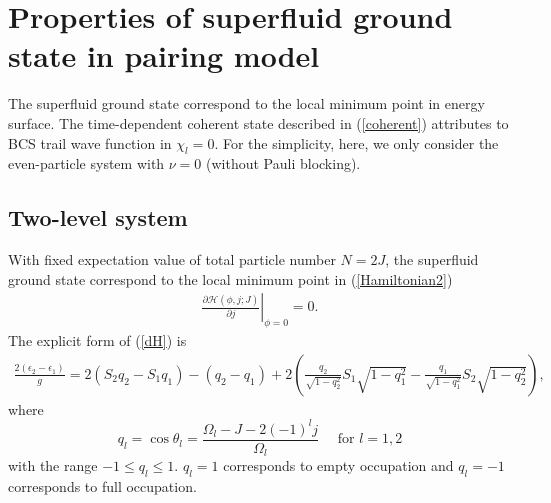 \documentclass[11pt]{book} %
\begin{document}
\clearpage{\pagestyle{empty}\cleardoublepage}
\chapter{Properties of superfluid ground state in pairing model}
The superfluid ground state correspond to the local minimum point in energy surface. The time-dependent coherent state described in (\ref{coherent}) attributes to BCS trail wave function in $\chi_l=0$. For the simplicity, here, we only consider the even-particle system with $\nu=0$ (without Pauli blocking).

\section{Two-level system}
\label{two-level}
With fixed expectation value of total particle number $N=2J$, the superfluid ground state correspond to the local minimum point in (\ref{Hamiltonian2})
\begin{align}
	\left. \frac{\partial\mathcal{H}(\phi,j;J)}{\partial j} \right|_{\phi=0}=0 .
	\label{dH}
\end{align}
The explicit form of (\ref{dH}) is
\begin{align}
	\frac{2(\epsilon_2-\epsilon_1)}{g} =
	2(S_2q_2-S_1q_1)-(q_2-q_1) + 2\left(\frac{q_2}{\sqrt{1-q_2^2}}S_1\sqrt{1-q_1^2}
	-\frac{q_1}{\sqrt{1-q_1^2}}S_2\sqrt{1-q_2^2}\right) ,
	\label{BCS_2level}
\end{align}
where 
\begin{equation}
	q_l=\cos{\theta_l} = \frac{\Omega_l - J -2(-1)^l j}{\Omega_l} 
	\quad \mbox{ for } l=1,2
	\label{q_l}
\end{equation}
with the range $-1\le q_l\le 1$. $q_l=1$ corresponds to empty occupation and $q_l=-1$ corresponds to full occupation. 
\end{document}
